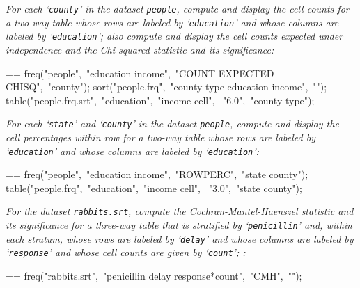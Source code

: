 \documentclass{book}
\makeatletter
\newenvironment{Texinfopreformatted}{%
  \par\GNUTobeylines\obeyspaces\frenchspacing\parskip=\z@\parindent=\z@}{}
{\catcode`\^^M=13 \gdef\GNUTobeylines{\catcode`\^^M=13 \def^^M{\null\par}}}
\newenvironment{Texinfoindented}{\begin{list}{}{}\item\relax}{\end{list}}
\renewcommand{\_}{\Texinfounderscore\discretionary{}{}{}}
\makeatother
\begin{document}
\emph{For each `\texttt{county}' in
the dataset \texttt{people}, compute and display the cell
counts for a two-way table whose rows are labeled by
`\texttt{education}' and whose columns are labeled by `\texttt{education}';
also compute and display the cell counts expected under independence and
the Chi-squared statistic and its significance:}
\begin{Texinfoindented}
\begin{Texinfopreformatted}%
\ttfamily freq("people",\ "education income",\ "COUNT EXPECTED CHISQ",\ "county");
sort("people.frq",\ "county \_type\_ education income",\ "");
table("people.frq.srt",\ "education",\ "income \_cell\_",
\                                             "6.0",\ "county \_type\_");
\end{Texinfopreformatted}
\end{Texinfoindented}

\emph{For each `\texttt{state}' and `\texttt{county}' in
the dataset \texttt{people}, compute and display the cell
percentages within row for a two-way table whose rows are labeled by
`\texttt{education}' and whose columns are labeled by `\texttt{education}':}
\begin{Texinfoindented}
\begin{Texinfopreformatted}%
\ttfamily freq("people",\ "education income",\ "ROWPERC",\ "state county");
table("people.frq",\ "education",\ "income \_cell\_",
\                                             "3.0",\ "state county");
\end{Texinfopreformatted}
\end{Texinfoindented}

\emph{For the dataset \texttt{rabbits.srt}, compute
the Cochran-Mantel-Haenszel statistic and its significance
for a three-way table that is stratified by
`\texttt{penicillin}' and, within each stratum,
whose rows are labeled by
`\texttt{delay}' and whose columns are labeled by `\texttt{response}' and
whose cell counts are given by `\texttt{count}';
:}
\begin{Texinfoindented}
\begin{Texinfopreformatted}%
\ttfamily freq("rabbits.srt",\ "penicillin delay response*count",\ "CMH",\ "");
\end{Texinfopreformatted}
\end{Texinfoindented}
\end{document}

